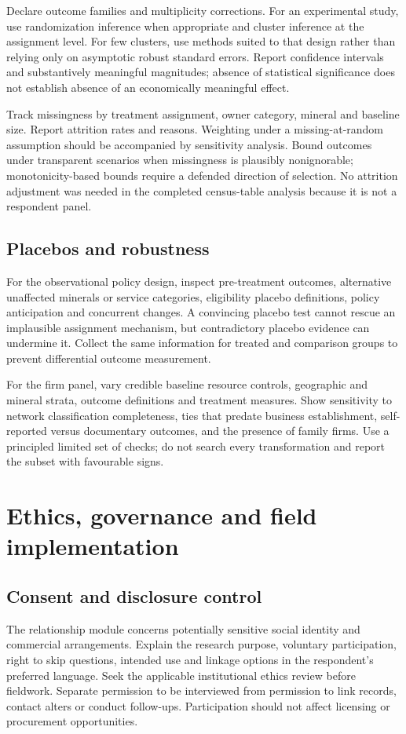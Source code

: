 \documentclass[11pt,a4paper]{report}
\begin{document}
Declare outcome families and multiplicity corrections. For an experimental study, use randomization inference when appropriate and cluster inference at the assignment level. For few clusters, use methods suited to that design rather than relying only on asymptotic robust standard errors. Report confidence intervals and substantively meaningful magnitudes; absence of statistical significance does not establish absence of an economically meaningful effect.

Track missingness by treatment assignment, owner category, mineral and baseline size. Report attrition rates and reasons. Weighting under a missing-at-random assumption should be accompanied by sensitivity analysis. Bound outcomes under transparent scenarios when missingness is plausibly nonignorable; monotonicity-based bounds require a defended direction of selection. No attrition adjustment was needed in the completed census-table analysis because it is not a respondent panel.

\section{Placebos and robustness}
For the observational policy design, inspect pre-treatment outcomes, alternative unaffected minerals or service categories, eligibility placebo definitions, policy anticipation and concurrent changes. A convincing placebo test cannot rescue an implausible assignment mechanism, but contradictory placebo evidence can undermine it. Collect the same information for treated and comparison groups to prevent differential outcome measurement.

For the firm panel, vary credible baseline resource controls, geographic and mineral strata, outcome definitions and treatment measures. Show sensitivity to network classification completeness, ties that predate business establishment, self-reported versus documentary outcomes, and the presence of family firms. Use a principled limited set of checks; do not search every transformation and report the subset with favourable signs.

\chapter{Ethics, governance and field implementation}
\section{Consent and disclosure control}
The relationship module concerns potentially sensitive social identity and commercial arrangements. Explain the research purpose, voluntary participation, right to skip questions, intended use and linkage options in the respondent's preferred language. Seek the applicable institutional ethics review before fieldwork. Separate permission to be interviewed from permission to link records, contact alters or conduct follow-ups. Participation should not affect licensing or procurement opportunities.
\end{document}
